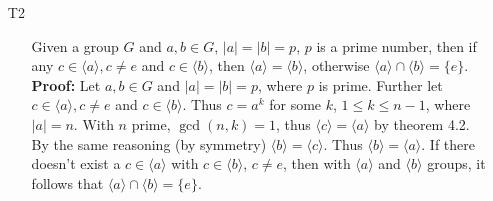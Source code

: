 \documentclass[12pt]{article}
\begin{document}
\begin{enumerate}
\item[T2]
\begin{enumerate}
\item[] Given a group $G$ and $a, b \in G$, $|a| = |b| = p$, $p$ is a prime number,
then if any $c \in \langle a\rangle, c \neq e$ and $c \in \langle b\rangle$, then
$\langle a\rangle = \langle b\rangle$, otherwise 
$\langle a\rangle \cap \langle b\rangle = \{ e \}$. \\
{\bf Proof:} Let $a, b \in G$ and $|a| = |b| = p$, where $p$ is prime.
Further let $c \in \langle a\rangle, c \neq e$ and $c \in \langle b\rangle$. Thus
$c = a^k$ for some $k$, $1 \leq k \leq n-1$, where $|a| = n$. With $n$ prime, 
$\gcd(n, k) = 1$, thus $\langle c\rangle = \langle a\rangle$ by theorem 4.2. 
By the same reasoning (by symmetry) $\langle b\rangle = \langle c\rangle$.
Thus $\langle b\rangle = \langle a\rangle$. If there doesn't exist a $c \in \langle a
\rangle$ with $c \in \langle b\rangle$, $c \neq e$, then with 
$\langle a\rangle$ and $\langle b\rangle$ groups, it follows that 
$\langle a\rangle \cap \langle b\rangle = \{ e \}$.
\end{enumerate}


\end{enumerate}
\end{document}
